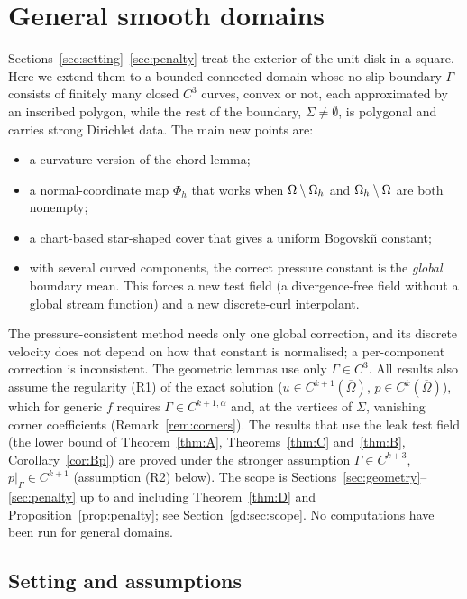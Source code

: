 \section{General smooth domains}\label{gd:sec}

Sections~\ref{sec:setting}--\ref{sec:penalty} treat the exterior of the unit disk in a square. Here we extend them to a bounded connected domain whose no-slip boundary $\Gamma$ consists of finitely many closed $C^3$ curves, convex or not, each approximated by an inscribed polygon, while the rest of the boundary, $\Sigma\neq\emptyset$, is polygonal and carries strong Dirichlet data. The main new points are:
\begin{itemize}
\item a curvature version of the chord lemma;
\item a normal-coordinate map $\Phi_h$ that works when $\Omega\setminus\Omega_h$ and $\Omega_h\setminus\Omega$ are both nonempty;
\item a chart-based star-shaped cover that gives a uniform Bogovski\u{\i} constant;
\item with several curved components, the correct pressure constant is the \emph{global} boundary mean. This forces a new test field (a divergence-free field without a global stream function) and a new discrete-curl interpolant.
\end{itemize}
The pressure-consistent method needs only one global correction, and its discrete velocity does not depend on how that constant is normalised; a per-component correction is inconsistent. The geometric lemmas use only $\Gamma\in C^3$. All results also assume the regularity (R1) of the exact solution ($u\in C^{k+1}(\overline\Omega)$, $p\in C^k(\overline\Omega)$), which for generic $f$ requires $\Gamma\in C^{k+1,\alpha}$ and, at the vertices of $\Sigma$, vanishing corner coefficients (Remark~\ref{rem:corners}). The results that use the leak test field (the lower bound of Theorem~\ref{thm:A}, Theorems~\ref{thm:C} and~\ref{thm:B}, Corollary~\ref{cor:Bp}) are proved under the stronger assumption $\Gamma\in C^{k+3}$, $p|_\Gamma\in C^{k+1}$ (assumption (R2) below). The scope is Sections~\ref{sec:geometry}--\ref{sec:penalty} up to and including Theorem~\ref{thm:D} and Proposition~\ref{prop:penalty}; see Section~\ref{gd:sec:scope}. No computations have been run for general domains.

\subsection{Setting and assumptions}\label{gd:sec:setting}

